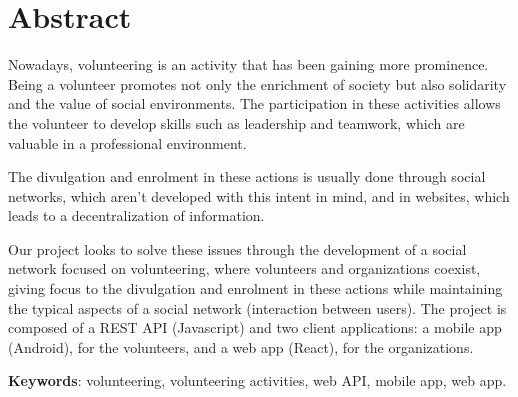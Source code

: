 \section*{Abstract}
Nowadays, volunteering is an activity that has been gaining more prominence.
Being a volunteer promotes not only the enrichment of society but also solidarity and the value of social environments. The participation in these activities allows the volunteer to develop skills such as leadership and teamwork, which are valuable in a professional environment. \par \smallskip
The divulgation and enrolment in these actions is usually done through social networks, which aren't developed with this intent in mind, and in websites, which leads to a decentralization of information. \par \smallskip
Our project looks to solve these issues through the development of a social network focused on volunteering, where volunteers and organizations coexist, giving focus to the divulgation and enrolment in these actions while maintaining the typical aspects of a social network (interaction between users). The project is composed of a REST API (Javascript) and two client applications: a mobile app (Android), for the volunteers, and a web app (React), for the organizations. \par \smallskip
\textbf{Keywords}: volunteering, volunteering activities, web API, mobile app, web app.